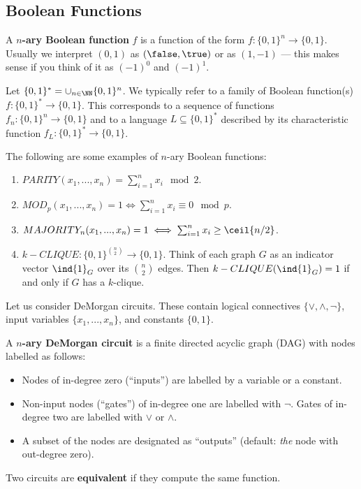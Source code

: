 	\subsection{Boolean Functions}
	\label{section:definitions}
	\begin{definition}
		A \textbf{$n$-ary Boolean function} $f$ is a function of the form $f: \{0,1\}^n \rightarrow \{0,1\}$. Usually we interpret $(0,1)$ as $(\false, \true)$ or as $(1,-1)$ --- this makes sense if you think of it as $(-1)^0$ and $(-1)^{1}$.
	\end{definition}
	
	Let $\{0,1\}^* = \cup_{n \in \NN} \{0,1\}^n$. We typically refer to a family of Boolean function(s) $f: \{0,1\}^* \rightarrow \{0,1\}$. This corresponds to a sequence of functions $f_n: \{0,1\}^n \rightarrow \{0,1\}$ and to a language $L \subseteq \{0, 1\}^*$ described by its characteristic function $f_L: \{0,1\}^* \rightarrow \{0,1\}$.
	
	\begin{example}
		The following are some examples of $n$-ary Boolean functions:
		\begin{enumerate}
			\item $PARITY(x_1, ..., x_n) = \sum_{i = 1}^{n} x_i \mod 2$.
			\item $MOD_p(x_1, ..., x_n) = 1 \iff \sum_{i = 1}^{n} x_i \equiv 0 \mod p$.
			\item $MAJORITY_n(x_1, ..., x_n) = 1 \iff \sum_{i=1}^{n} x_i \geq \ceil{n/2}$.
			\item $k-CLIQUE: \{0,1\}^{\binom{n}{2}} \rightarrow \{0,1\}$. Think of each graph $G$ as an indicator vector $\ind{1}_G$ over its $\binom{n}{2}$ edges. Then $k-CLIQUE(\ind{1}_G) = 1$ if and only if $G$ has a $k$-clique.
		\end{enumerate}
	\end{example}
	
	Let us consider DeMorgan circuits. These contain logical connectives $\{\lor, \land, \lnot\}$, input variables $\{x_1, ..., x_n\}$, and constants $\{0,1\}$. 
	
	\begin{definition}
		\label{def:demorgancircuit}
		A \textbf{$n$-ary DeMorgan circuit} is a finite directed acyclic graph (DAG) with nodes labelled as follows:
		\begin{itemize}
			\item Nodes of in-degree zero (``inputs'') are labelled by a variable or a constant.
			\item Non-input nodes (``gates'') of in-degree one are labelled with $\lnot$. Gates of in-degree two are labelled with $\lor$ or $\land$.
			\item A subset of the nodes are designated as ``outputs'' (default: \emph{the} node with out-degree zero).
		\end{itemize}
		Two circuits are \textbf{equivalent} if they compute the same function.
	\end{definition}
	
